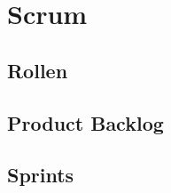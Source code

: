 
\section{Scrum}\label{sec:scrum}

\renewcommand{\kapitelautor}{Autor: Irgendwer} %

\subsection{Rollen}\label{subsec:rollen}

%
%

\subsection{Product Backlog}\label{subsec:product-backlog}

%
%

\subsection{Sprints}\label{subsec:sprints}

%
%

\renewcommand{\kapitelautor}{}
